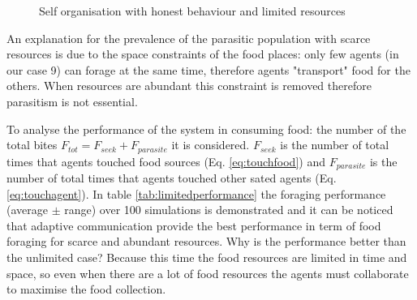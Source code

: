 \begin{figure}
\centerline{
\hfil
{}}
\caption[Self organisation with honest behaviour and limited resources]{Self organisation with honest behaviour and limited resources\label{fig:limitedcomparison}}
\label{fig_sim}
\end{figure}
An explanation for the prevalence of the parasitic population with scarce
resources is due to the space constraints of the food places: only few agents
 (in our case 9) can forage at the same time, therefore agents "transport"
food for the others. When resources are abundant this constraint is
removed therefore parasitism is not essential.

To analyse the performance of the system in consuming food: the number of the total
bites $F_{tot}=F_{seek}+F_{parasite}$ it is considered.
$F_{seek}$ is the number of total times that agents touched food sources
(Eq. \ref{eq:touchfood}) and $F_{parasite}$ is the number of total times that
agents touched other sated agents (Eq. \ref{eq:touchagent}).
In table \ref{tab:limitedperformance} the foraging performance
(average $\pm$ range) over 100 simulations is demonstrated and it can be noticed that adaptive
communication provide the best performance in term of food foraging for scarce
and abundant resources. Why is the performance better than the unlimited case?
Because this time the food resources are limited in time and space, so even when
 there are a lot of food resources the agents must collaborate to maximise
the food collection.

